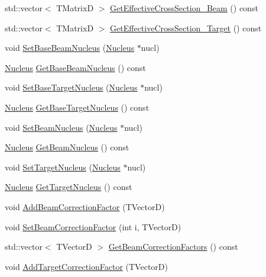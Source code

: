 \begin{DoxyCompactItemize}
\item 
std\-::vector$<$ T\-Matrix\-D $>$ \hyperlink{classCoulExSimFitter_aa5113d708b9c44717998ef6f81c4a8a7}{Get\-Effective\-Cross\-Section\-\_\-\-Beam} () const 
\item 
std\-::vector$<$ T\-Matrix\-D $>$ \hyperlink{classCoulExSimFitter_ac6e6047ad8ac3a3201dfa742d829c66a}{Get\-Effective\-Cross\-Section\-\_\-\-Target} () const 
\item 
void \hyperlink{classCoulExSimFitter_a5f107c68537522704cfbea61406429e7}{Set\-Base\-Beam\-Nucleus} (\hyperlink{classNucleus}{Nucleus} $\ast$nucl)
\item 
\hyperlink{classNucleus}{Nucleus} \hyperlink{classCoulExSimFitter_aadd6ced090e569701768878ac944d1fb}{Get\-Base\-Beam\-Nucleus} () const 
\item 
void \hyperlink{classCoulExSimFitter_a97c35d0432333cefb1aeb256dc4e6ca8}{Set\-Base\-Target\-Nucleus} (\hyperlink{classNucleus}{Nucleus} $\ast$nucl)
\item 
\hyperlink{classNucleus}{Nucleus} \hyperlink{classCoulExSimFitter_a04f0ec899416e173065b282fcfd89796}{Get\-Base\-Target\-Nucleus} () const 
\item 
void \hyperlink{classCoulExSimFitter_aae95c6ebc60c00fb25b6466856ff4e92}{Set\-Beam\-Nucleus} (\hyperlink{classNucleus}{Nucleus} $\ast$nucl)
\item 
\hyperlink{classNucleus}{Nucleus} \hyperlink{classCoulExSimFitter_a40bc47bee8f51f9dab8763e87c34fb63}{Get\-Beam\-Nucleus} () const 
\item 
void \hyperlink{classCoulExSimFitter_ae7d4c64f558a035a2f3d6993db2969ed}{Set\-Target\-Nucleus} (\hyperlink{classNucleus}{Nucleus} $\ast$nucl)
\item 
\hyperlink{classNucleus}{Nucleus} \hyperlink{classCoulExSimFitter_a6eacf96639a5bd3908636ab253d8c9b3}{Get\-Target\-Nucleus} () const 
\item 
void \hyperlink{classCoulExSimFitter_afe7d584cbdec110df18b34e5bd0bf2dc}{Add\-Beam\-Correction\-Factor} (T\-Vector\-D)
\item 
void \hyperlink{classCoulExSimFitter_a38af2f165ee0e21c2f037b8d8eddee78}{Set\-Beam\-Correction\-Factor} (int i, T\-Vector\-D)
\item 
std\-::vector$<$ T\-Vector\-D $>$ \hyperlink{classCoulExSimFitter_afebf6d2ace4db82026f6ccc865fa821c}{Get\-Beam\-Correction\-Factors} () const 
\item 
void \hyperlink{classCoulExSimFitter_a9c4f96557f62a6f0dbd9386841cd8860}{Add\-Target\-Correction\-Factor} (T\-Vector\-D)
\item 

\end{DoxyCompactItemize}
